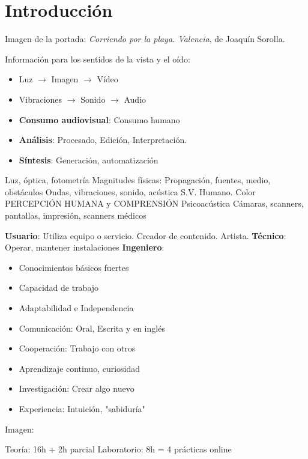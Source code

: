 \documentclass[a4paper]{book}
\begin{document}
\newpage
{}
{}
\section*{Introducción}
Imagen de la portada: \textsl{Corriendo por la playa. Valencia}, de Joaquín Sorolla.

Información para los sentidos de la vista y el oído:
\begin{itemize}
	\item Luz $\longrightarrow$ Imagen $\longrightarrow$ Vídeo
	\item Vibraciones $\longrightarrow$ Sonido $\longrightarrow$ Audio
\end{itemize}

\begin{itemize}
	\item \textbf{Consumo audiovisual}: Consumo humano
	\item \textbf{Análisis}: Procesado, Edición, Interpretación.
	\item \textbf{Síntesis}: Generación, automatización
\end{itemize}

Luz, óptica, fotometría  Magnitudes físicas: Propagación, fuentes, medio, obstáculos
Ondas, vibraciones, sonido, acústica
S.V. Humano. Color PERCEPCIÓN HUMANA y COMPRENSIÓN Psicoacústica
Cámaras, scanners, pantallas, impresión, scanners médicos

\textbf{Usuario}: Utiliza equipo o servicio. Creador de contenido. Artista.
\textbf{Técnico}: Operar, mantener instalaciones
\textbf{Ingeniero}:
\begin{itemize}
	\item Conocimientos básicos fuertes
	\item Capacidad de trabajo
	\item Adaptabilidad e Independencia
	\item Comunicación: Oral, Escrita y en inglés
	\item Cooperación: Trabajo con otros
	\item Aprendizaje continuo, curiosidad
	\item Investigación: Crear algo nuevo
	\item Experiencia: Intuición, "sabiduría"
\end{itemize}

Imagen:

Teoría: 16h + 2h parcial
Laboratorio: 8h = 4 prácticas online
\end{document}
